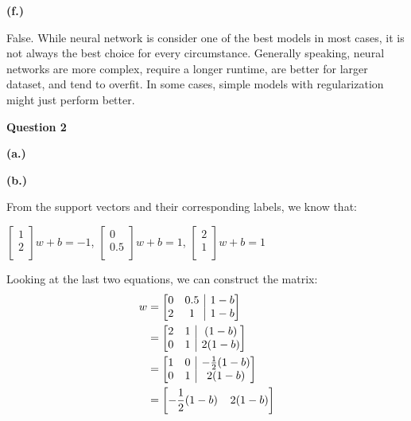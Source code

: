 \documentclass{article}
\begin{document}
\vspace{5mm}\textbf{(f.)}
\begin{flushleft}
    False. While neural network is consider one of the best models in most cases, it is not always the best choice for every circumstance.
    Generally speaking, neural networks are more complex, require a longer runtime, are better for larger dataset, and tend to overfit. 
    In some cases, simple models with regularization might just perform better.
\end{flushleft}


\pagebreak
\begin{spacing}{3}{\bfseries\LARGE Question 2}\end{spacing}
\textbf{(a.)}

\vspace{5mm}\textbf{(b.)}
\begin{flushleft}
    From the support vectors and their corresponding labels, we know that:
\end{flushleft}
\begin{center}
    $\begin{bmatrix}1 \\ 2 \\\end{bmatrix} w + b = -1$,
    $\begin{bmatrix}0 \\ 0.5 \\\end{bmatrix} w + b = 1$,
    $\begin{bmatrix}2 \\ 1 \\\end{bmatrix} w + b = 1$
\end{center}
Looking at the last two equations, we can construct the matrix:
\begin{align*}
    w &= \left[\begin{array}{@{}cc|c@{}}
        0 & 0.5 & 1-b \\
        2 & 1 & 1-b
    \end{array}\right]
    \\&= \left[\begin{array}{@{}cc|c@{}}
        2 & 1 & (1-b) \\
        0 & 1 & 2(1-b)
    \end{array}\right]
    \\&= \left[\begin{array}{@{}cc|c@{}}
        1 & 0 & -\frac{1}{2}(1-b) \\
        0 & 1 & 2(1-b)
    \end{array}\right]
    \\&= \left[-\frac{1}{2}(1-b) \;\;\;\; 2(1-b)\right]
\end{align*}
\end{document}
